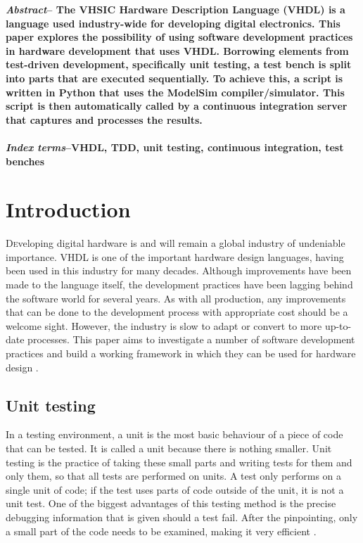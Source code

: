 \documentclass[twoside]{article}
\begin{document}
\begin{multicols}{2} %

\textbf{\emph{Abstract}-- The VHSIC Hardware Description Language (VHDL) is a language used industry-wide for developing digital electronics. This paper explores the possibility of using software development practices in hardware development that uses VHDL. Borrowing elements from test-driven development, specifically unit testing, a test bench is split into parts that are executed sequentially. To achieve this, a script is written in Python that uses the ModelSim compiler/simulator. This script is then automatically called by a continuous integration server that captures and processes the results.
\\
\\
\emph{Index terms}--VHDL, TDD, unit testing, continuous integration, test benches}


\section{Introduction}
\lettrine[nindent=0em,lines=3]{D} eveloping digital hardware is and will remain a global industry of undeniable importance. VHDL is one of the important hardware design languages, having been used in this industry for many decades. Although improvements have been made to the language itself, the development practices have been lagging behind the software world for several years. As with all production, any improvements that can be done to the development process with appropriate cost should be a welcome sight. However, the industry is slow to adapt or convert to more up-to-date processes. This paper aims to investigate a number of software development practices and build a working framework in which they can be used for hardware design \cite{vhdlorigin,vhdlsim,vhdlsynth}.
%
%


\subsection{Unit testing}
In a testing environment, a unit is the most basic behaviour of a piece of code that can be tested. It is called a unit because there is nothing smaller. Unit testing is the practice of taking these small parts and writing tests for them and only them, so that all tests are performed on units. A test only performs on a single unit of code; if the test uses parts of code outside of the unit, it is not a unit test. One of the biggest advantages of this testing method is the precise debugging information that is given should a test fail. After the pinpointing, only a small part of the code needs to be examined, making it very efficient \cite{extremeunit,VHDLUnit}.


\end{multicols}
\end{document}
